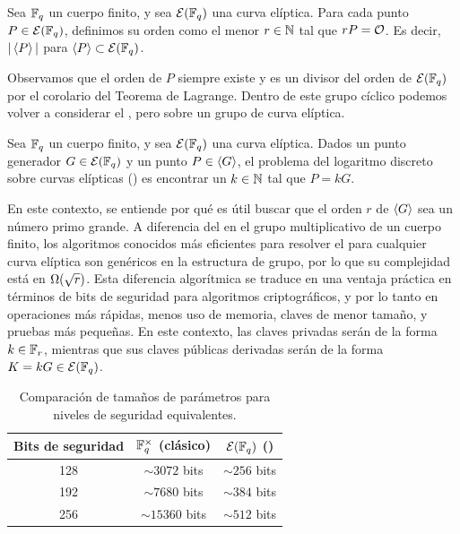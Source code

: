 \begin{definition}
\label{def:apendice-a-curvas-elipticas-orden-de-un-punto-en-una-curva-eliptica}
		Sea $\mathbb{F}_q$ un cuerpo finito, y sea $\mathcal{E}(\mathbb{F}_q)$ una curva elíptica. Para cada punto $P \in \mathcal{E}(\mathbb{F}_q)$, definimos su orden como el menor $r \in \mathbb{N}$ tal que $rP = \mathcal{O}$. Es decir, $|\left\langle P \right\rangle|$ para $\left\langle P \right\rangle \subset \mathcal{E}(\mathbb{F}_q)$.
\end{definition}

Observamos que el orden de $P$ siempre existe y es un divisor del orden de $\mathcal{E}(\mathbb{F}_q)$ por el corolario del Teorema de Lagrange. Dentro de este grupo cíclico podemos volver a considerar el \DLP, pero sobre un grupo de curva elíptica.

\begin{definition}[\ECDLP]
\label{def:apendice-a-curvas-elipticas-ecdlp}
		Sea $\mathbb{F}_q$ un cuerpo finito, y sea $\mathcal{E}(\mathbb{F}_q)$ una curva elíptica. Dados un punto generador $G \in \mathcal{E}(\mathbb{F}_q)$ y un punto $P \in \left\langle G \right\rangle$, el problema del logaritmo discreto sobre curvas elípticas (\ECDLP) es encontrar un $k \in \mathbb{N}$ tal que $P = kG$.
\end{definition}

En este contexto, se entiende por qué es útil buscar que el orden $r$ de $\left\langle G \right\rangle$ sea un número primo grande. A diferencia del \DLP en el grupo multiplicativo de un cuerpo finito, los algoritmos conocidos más eficientes para resolver el \ECDLP para cualquier curva elíptica son genéricos en la estructura de grupo, por lo que su complejidad está en $\Omega(\sqrt{r})$. Esta diferencia algorítmica se traduce en una ventaja práctica en términos de bits de seguridad para algoritmos criptográficos, y por lo tanto en operaciones más rápidas, menos uso de memoria, claves de menor tamaño, y pruebas más pequeñas. En este contexto, las claves privadas serán de la forma $k \in \mathbb{F}_r$, mientras que sus claves públicas derivadas serán de la forma $K = kG \in \mathcal{E}(\mathbb{F}_q)$.

\begin{table}[h]
	\centering
	\begin{tabular}{ccc}
		\toprule
		\textbf{Bits de seguridad} &
		\textbf{$\mathbb{F}_{q}^{\times}$ (\DLP clásico)} &
		\textbf{$\mathcal{E}(\mathbb{F}_q)$ (\ECDLP)} \\
		\midrule
		128 & $\sim 3072$ bits & $\sim 256$ bits \\
		192 & $\sim 7680$ bits & $\sim 384$ bits \\
		256 & $\sim 15360$ bits & $\sim 512$ bits \\
		\bottomrule
	\end{tabular}
	\caption{Comparación de tamaños de parámetros para niveles de seguridad equivalentes.}
	\label{tab:security-comparison}
\end{table}


